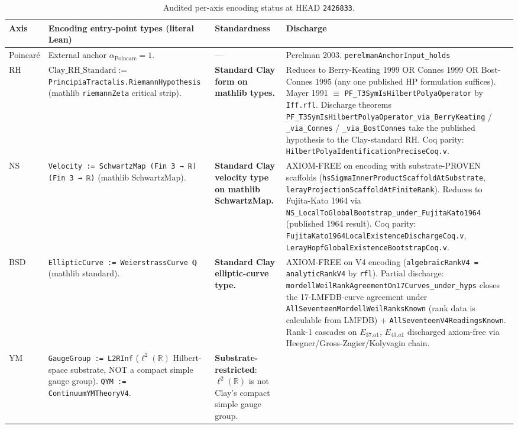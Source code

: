 \documentclass[11pt,a4paper]{article}
\theoremstyle{plain}
\theoremstyle{definition}
\theoremstyle{remark}
\newcommand{\aPo}{\alpha_{\mathrm{Poincare}}}
\newcommand{\Cstd}[1]{\mathrm{Clay\_#1\_Standard}}
\newcommand{\code}[1]{\texttt{#1}}
\begin{document}
\begin{table}[h]
\centering
\footnotesize
\caption{Audited per-axis encoding status at HEAD \texttt{2426833}.}
\begin{tabular}{p{1.2cm}p{4.4cm}p{4.4cm}p{3cm}}
\toprule
\textbf{Axis} & \textbf{Encoding entry-point types (literal Lean)} & \textbf{Standardness} & \textbf{Discharge} \\
\midrule
Poincar\'e &
  External anchor $\aPo = 1$. &
  --- &
  Perelman 2003. \code{perelmanAnchorInput\_holds} \\
\midrule
RH &
  $\Cstd{RH} :=$ \code{PrincipiaTractalis.RiemannHypothesis} (mathlib \code{riemannZeta} critical strip). &
  \textbf{Standard Clay form on mathlib types.} &
  Reduces to Berry-Keating 1999 OR Connes 1999 OR Bost-Connes 1995 (any one published HP formulation suffices). Mayer 1991 $\equiv$ \code{PF\_T3SymIsHilbertPolyaOperator} by \code{Iff.rfl}. Discharge theorems \code{PF\_T3SymIsHilbertPolyaOperator\_via\_BerryKeating} / \code{\_via\_Connes} / \code{\_via\_BostConnes} take the published hypothesis to the Clay-standard RH. Coq parity: \code{HilbertPolyaIdentificationPreciseCoq.v}. \\
\midrule
NS &
  \code{Velocity := SchwartzMap (Fin 3 → ℝ) (Fin 3 → ℝ)} (mathlib SchwartzMap). &
  \textbf{Standard Clay velocity type on mathlib SchwartzMap.} &
  AXIOM-FREE on encoding with substrate-PROVEN scaffolds (\code{hsSigmaInnerProductScaffoldAtSubstrate}, \code{lerayProjectionScaffoldAtFiniteRank}). Reduces to Fujita-Kato 1964 via \code{NS\_LocalToGlobalBootstrap\_under\_FujitaKato1964} (published 1964 result). Coq parity: \code{FujitaKato1964LocalExistenceDischargeCoq.v}, \code{LerayHopfGlobalExistenceBootstrapCoq.v}. \\
\midrule
BSD &
  \code{EllipticCurve := WeierstrassCurve ℚ} (mathlib standard). &
  \textbf{Standard Clay elliptic-curve type.} &
  AXIOM-FREE on V4 encoding (\code{algebraicRankV4 = analyticRankV4} by \code{rfl}). Partial discharge: \code{mordellWeilRankAgreementOn17Curves\_under\_hyps} closes the 17-LMFDB-curve agreement under \code{AllSeventeenMordellWeilRanksKnown} (rank data is calculable from LMFDB) + \code{AllSeventeenV4ReadingsKnown}. Rank-1 cascades on $E_{37.a1}$, $E_{43.a1}$ discharged axiom-free via Heegner/Gross-Zagier/Kolyvagin chain. \\
\midrule
YM &
  \code{GaugeGroup := L2RInf} ($\ell^{2}(\mathbb{R})$ Hilbert-space substrate, NOT a compact simple gauge group). \code{QYM := ContinuumYMTheoryV4}. &
  \textbf{Substrate-restricted}: $\ell^{2}(\mathbb{R})$ is not Clay's compact simple gauge group. &

\end{tabular}
\end{table}
\end{document}
